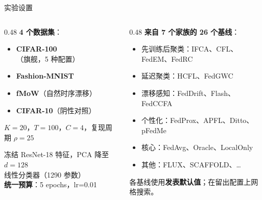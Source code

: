 \documentclass[aspectratio=169,11pt]{ctexbeamer}
\begin{document}
\begin{frame}{实验设置}

\begin{columns}[T]
\begin{column}{0.48\textwidth}
\textbf{4 个数据集}：
\begin{itemize}
  \item \textbf{CIFAR-100}（旗舰，5 种配置）
  \item \textbf{Fashion-MNIST}
  \item \textbf{fMoW}（自然时序漂移）
  \item \textbf{CIFAR-10}（阴性对照）
\end{itemize}

\vspace{6pt}
$K{=}20$，$T{=}100$，$C{=}4$，复现周期 $\rho{=}25$

\vspace{4pt}
冻结 ResNet-18 特征，PCA 降至 $d{=}128$\\
线性分类器（1290 参数）\\
\textbf{统一预算}：5 epochs，lr=0.01
\end{column}

\begin{column}{0.48\textwidth}
\textbf{来自 7 个家族的 26 个基线}：
\begin{itemize}
  \item \textcolor{cA}{先训练后聚类}：IFCA、CFL、FedEM、FedRC
  \item 延迟聚类：HCFL、FedGWC
  \item 漂移感知：FedDrift、Flash、FedCCFA
  \item 个性化：FedProx、APFL、Ditto、pFedMe
  \item 核心：FedAvg、Oracle、LocalOnly
  \item 其他：FLUX、SCAFFOLD、\ldots
\end{itemize}

\vspace{6pt}
各基线使用\textbf{发表默认值}；在留出配置上网格搜索。
\end{column}
\end{columns}
\end{frame}
\end{document}
